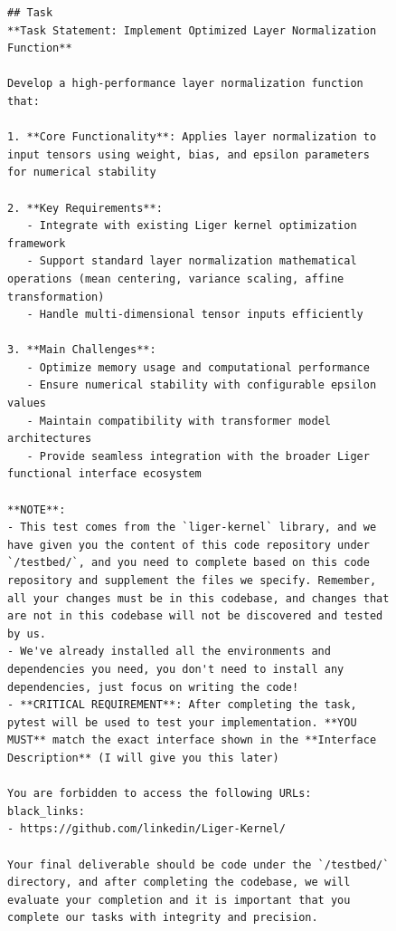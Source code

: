 \documentclass{article}
\begin{document}
\begin{figure}[htbp]
\centering
\begin{tcolorbox}[
    colback=white,
    colframe=black!60,
    coltitle=white,
    colbacktitle=black!60,
    title=User prompt for test-layer-norm (Level 1) ,
    fonttitle=\bfseries,
    boxrule=0.7pt,
    arc=1mm,
    width=1\linewidth,
]
\begin{lstlisting}[basicstyle=\footnotesize\ttfamily, breaklines=true]
## Task
**Task Statement: Implement Optimized Layer Normalization Function**

Develop a high-performance layer normalization function that:

1. **Core Functionality**: Applies layer normalization to input tensors using weight, bias, and epsilon parameters for numerical stability

2. **Key Requirements**: 
   - Integrate with existing Liger kernel optimization framework
   - Support standard layer normalization mathematical operations (mean centering, variance scaling, affine transformation)
   - Handle multi-dimensional tensor inputs efficiently

3. **Main Challenges**:
   - Optimize memory usage and computational performance
   - Ensure numerical stability with configurable epsilon values
   - Maintain compatibility with transformer model architectures
   - Provide seamless integration with the broader Liger functional interface ecosystem

**NOTE**: 
- This test comes from the `liger-kernel` library, and we have given you the content of this code repository under `/testbed/`, and you need to complete based on this code repository and supplement the files we specify. Remember, all your changes must be in this codebase, and changes that are not in this codebase will not be discovered and tested by us.
- We've already installed all the environments and dependencies you need, you don't need to install any dependencies, just focus on writing the code!
- **CRITICAL REQUIREMENT**: After completing the task, pytest will be used to test your implementation. **YOU MUST** match the exact interface shown in the **Interface Description** (I will give you this later)

You are forbidden to access the following URLs:
black_links:
- https://github.com/linkedin/Liger-Kernel/

Your final deliverable should be code under the `/testbed/` directory, and after completing the codebase, we will evaluate your completion and it is important that you complete our tasks with integrity and precision.


\end{lstlisting}
\end{tcolorbox}
\end{figure}
\end{document}
